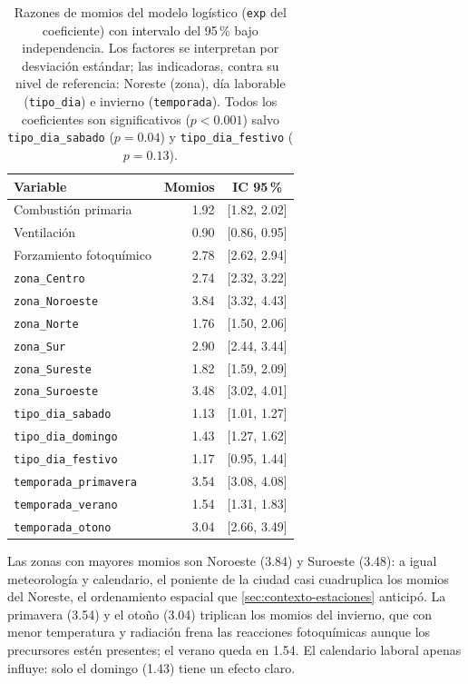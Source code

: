 \begin{table}[pos=t]
  \centering
  \caption{Razones de momios del modelo logístico (\texttt{exp} del
    coeficiente) con intervalo del 95\,\% bajo independencia. Los factores se
    interpretan por desviación estándar; las indicadoras, contra su nivel de
    referencia: Noreste (zona), día laborable (\texttt{tipo\_dia}) e
    invierno (\texttt{temporada}). Todos los coeficientes son significativos
    ($p<0.001$) salvo \texttt{tipo\_dia\_sabado} ($p=0.04$) y
    \texttt{tipo\_dia\_festivo} ($p=0.13$).}
  \label{tab:momios-log}
  \small
  \begin{tabular}{lrc}
    \toprule
    Variable & Momios & IC 95\,\% \\
    \midrule
    Combustión primaria     & 1.92 & [1.82, 2.02] \\
    Ventilación             & 0.90 & [0.86, 0.95] \\
    Forzamiento fotoquímico & 2.78 & [2.62, 2.94] \\
    \midrule
    \texttt{zona\_Centro}    & 2.74 & [2.32, 3.22] \\
    \texttt{zona\_Noroeste}  & 3.84 & [3.32, 4.43] \\
    \texttt{zona\_Norte}     & 1.76 & [1.50, 2.06] \\
    \texttt{zona\_Sur}       & 2.90 & [2.44, 3.44] \\
    \texttt{zona\_Sureste}   & 1.82 & [1.59, 2.09] \\
    \texttt{zona\_Suroeste}  & 3.48 & [3.02, 4.01] \\
    \midrule
    \texttt{tipo\_dia\_sabado}  & 1.13 & [1.01, 1.27] \\
    \texttt{tipo\_dia\_domingo} & 1.43 & [1.27, 1.62] \\
    \texttt{tipo\_dia\_festivo} & 1.17 & [0.95, 1.44] \\
    \midrule
    \texttt{temporada\_primavera} & 3.54 & [3.08, 4.08] \\
    \texttt{temporada\_verano}    & 1.54 & [1.31, 1.83] \\
    \texttt{temporada\_otono}     & 3.04 & [2.66, 3.49] \\
    \bottomrule
  \end{tabular}
\end{table}

Las zonas con mayores momios son Noroeste (3.84) y Suroeste (3.48): a igual
meteorología y calendario, el poniente de la ciudad casi cuadruplica los
momios del Noreste, el ordenamiento espacial que
\cref{sec:contexto-estaciones} anticipó. La primavera (3.54) y el otoño
(3.04) triplican los momios del invierno, que con menor temperatura y
radiación frena las reacciones fotoquímicas aunque los precursores estén
presentes; el verano queda en 1.54. El calendario laboral apenas influye:
solo el domingo (1.43) tiene un efecto claro.

